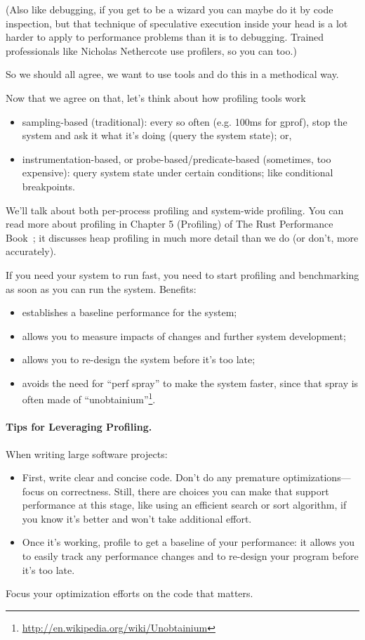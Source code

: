 (Also like debugging, if you get to be a wizard you can maybe do it by code inspection, but that technique of speculative execution inside your head is a lot harder to apply to performance problems than it is to debugging. Trained professionals like Nicholas Nethercote use profilers, so you can too.)

So we should all agree, we want to use tools and do this in a methodical way.

Now that we agree on that, let's think about how profiling tools work\:

\begin{itemize}[noitemsep]
\item sampling-based (traditional): every so often (e.g. 100ms for gprof), stop the system and ask it what it's doing (query the system state); or,
\item instrumentation-based, or probe-based/predicate-based
  (sometimes, too expensive): query system state under certain
  conditions; like conditional breakpoints.
\end{itemize}
We'll talk about both per-process profiling and system-wide profiling. You can read more about profiling in Chapter 5 (Profiling) of The Rust Performance Book~\cite{nethercote20:_rust_perfor_book}; it discusses heap profiling in much more detail than we do (or don't,
more accurately).

If you need your system to run fast, you need to start profiling
and benchmarking as soon as you can run the system. Benefits:
\begin{itemize}[noitemsep]
\item establishes a baseline performance for the system;
\item allows you to measure impacts of changes and further system development;
\item allows you to re-design the system before it's too late;
\item avoids the need for ``perf spray'' to make the system faster, since
that spray is often made of ``unobtainium''\footnote{\url{http://en.wikipedia.org/wiki/Unobtainium}}.
\end{itemize}

\paragraph{Tips for Leveraging Profiling.}
When writing large software projects:
  \begin{itemize}[noitemsep]
    \item First, write clear and concise code. Don't do any premature optimizations---focus on correctness. Still, there are choices you can make that support performance at this stage, like using an efficient search or sort algorithm, if you know it's better and won't take additional effort.
    \item Once it's working, profile to get a baseline of your performance: it allows you to easily track any performance changes and to re-design your program before it's too late.
  \end{itemize}
Focus your optimization efforts on the code that matters.

